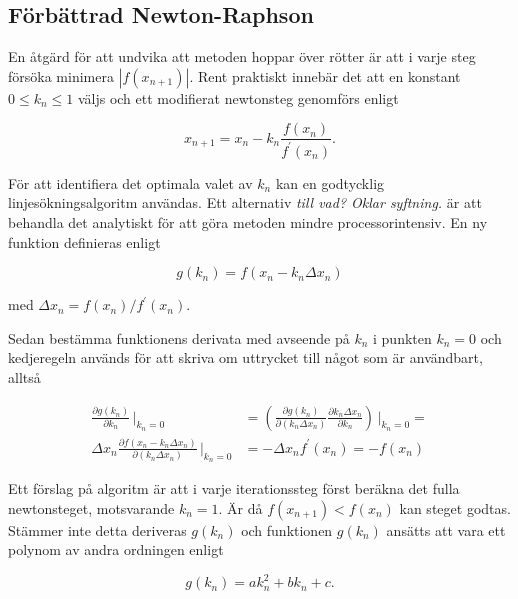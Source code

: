 \subsection{Förbättrad Newton-Raphson}

En åtgärd för att undvika att metoden hoppar över rötter är att i varje steg försöka minimera $|f(x_{n+1})|$.
Rent praktiskt innebär det att en konstant $0 \le k_n \le 1$ väljs och ett modifierat
newtonsteg genomförs enligt

\begin{equation}
\label{eq:newtonmodified}
x_{n+1} = x_n - k_n\frac{f(x_n)}{f^\prime(x_n)}.
\end{equation}

För att identifiera det optimala valet av $k_n$ kan en godtycklig linje\-söknings\-algoritm användas. Ett alternativ \emph{\color{red} till vad? Oklar syftning.}
är att behandla det analytiskt för att göra metoden mindre processor\-intensiv. En ny funktion definieras
enligt 

\begin{equation}
\label{eq:newtong}
g(k_n) = f(x_n- k_n\Delta x_n)
\end{equation}

med $\Delta x_n = f(x_n)/f^\prime(x_n)$.

Sedan bestämma funktionens derivata med avseende på $k_n$ i punkten $k_n=0$
och kedjeregeln används för att skriva om uttrycket till något som är användbart, alltså

\begin{align}
\frac{\partial g(k_n)}{\partial k_n}\,\bigg|_{k_n=0} & = 
\left(\frac{\partial g(k_n)}{\partial (k_n\Delta x_n)}
\frac{\partial k_n \Delta x_n}{\partial k_n}\right)\,\bigg|_{k_n=0} = \nonumber \\
\Delta x_n \frac{\partial f(x_n- k_n\Delta x_n)}{\partial (k_n\Delta x_n)}\,\bigg|_{k_n=0} & = 
-\Delta x_n f^\prime(x_n) = - f(x_n)
\label{eq:newtongmin}
\end{align}

Ett förslag på algoritm är att i varje iterations\-steg först beräkna det fulla newtonsteget, motsvarande $k_n=1$.
Är då $f(x_{n+1}) < f(x_n)$ kan steget godtas. Stämmer inte detta deriveras $g(k_n)$ och funktionen $g(k_n)$ ansätts att vara ett polynom av andra ordningen enligt

\begin{equation}
\label{eq:newtonfit}
g(k_n) = ak^2_n + bk_n + c.
\end{equation}


